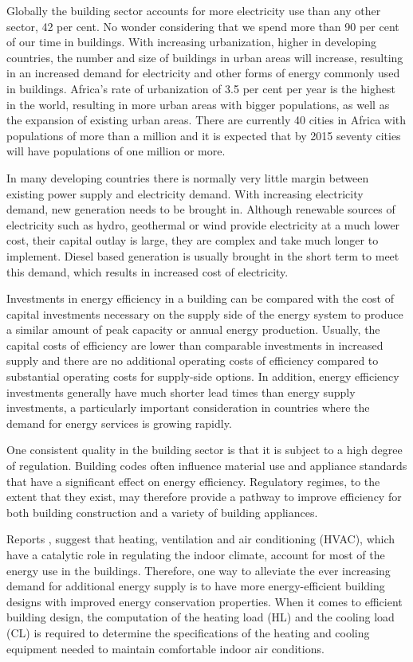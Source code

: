 Globally the building sector accounts for more electricity use than any other sector,
42 per cent. No wonder considering that we spend more than 90 per cent of our
time in buildings. With increasing urbanization, higher in developing countries,
the number and size of buildings in urban areas will increase, resulting in an
increased demand for electricity and other forms of energy commonly used in
buildings. Africa’s rate of urbanization of 3.5 per cent per year is the highest in
the world, resulting in more urban areas with bigger populations, as well as the
expansion of existing urban areas. There are currently 40 cities in Africa with
populations of more than a million and it is expected that by 2015 seventy cities
will have populations of one million or more.

In many developing countries there is normally very little margin between existing
power supply and electricity demand. With increasing electricity demand, new
generation needs to be brought in. Although renewable sources of electricity such
as hydro, geothermal or wind provide electricity at a much lower cost, their capital
outlay is large, they are complex and take much longer to implement. Diesel based
generation is usually brought in the short term to meet this demand, which
results in increased cost of electricity.

Investments in energy efficiency in a building can be compared with the cost of
capital investments necessary on the supply side of the energy system to produce
a similar amount of peak capacity or annual energy production. Usually, the
capital costs of efficiency are lower than comparable investments in increased
supply and there are no additional operating costs of efficiency compared to substantial
operating costs for supply-side options. In addition, energy efficiency
investments generally have much shorter lead times than energy supply investments,
a particularly important consideration in countries where the demand for
energy services is growing rapidly.

One consistent quality in the building sector is that it is subject to a high degree
of regulation. Building codes often influence material use and appliance standards
that have a significant effect on energy efficiency. Regulatory regimes, to
the extent that they exist, may therefore provide a pathway to improve efficiency
for both building construction and a variety of building appliances.

Reports \cite{perez2008pout}, \cite{cai2009ren} suggest that heating, ventilation and air conditioning (HVAC), which have a catalytic role in regulating the indoor climate, account for most of the energy use in the buildings. Therefore, one way to alleviate the ever increasing demand for additional energy supply is to have more energy-efficient building designs with improved energy conservation properties. When it comes to efficient building design, the computation of the heating load (HL) and the cooling load (CL) is required to determine the specifications of the heating and cooling equipment needed to maintain comfortable indoor air conditions.

